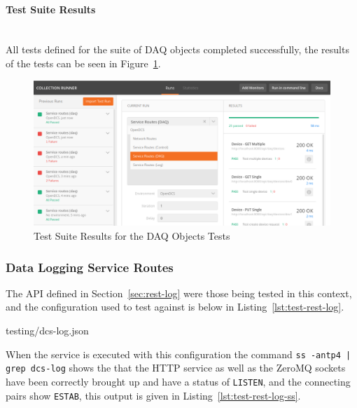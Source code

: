       \paragraph{Test Suite Results}\mbox{}\\

        All tests defined for the suite of DAQ objects completed
        successfully, the results of the tests can be seen in
        Figure~\ref{fig:test-postman-daq-suite}.

        \begin{figure}[H]
          \includegraphics[width=\textwidth]{figures/testing/postman-daq-suite-results}
          \caption{Test Suite Results for the DAQ Objects Tests}
          \label{fig:test-postman-daq-suite}
        \end{figure}

    \subsubsection{Data Logging Service Routes}\label{sec:test-rest-log}

      The API defined in Section~\ref{sec:rest-log} were those being tested in
      this context, and the configuration used to test against is below in
      Listing~\ref{lst:test-rest-log}.

      
                      {testing/dcs-log.json}

      When the service is executed with this configuration the command
      \texttt{ss -antp4 | grep dcs-log} shows the that the HTTP service as well
      as the ZeroMQ sockets have been correctly brought up and have a status of
      \texttt{LISTEN}, and the connecting pairs show \texttt{ESTAB}, this
      output is given in Listing~\ref{lst:test-rest-log-ss}.

